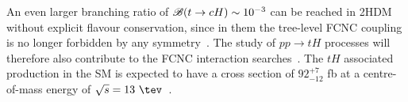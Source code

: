 An even larger branching ratio of  $\mathscr{B}(t\to cH) \sim 10^{-3}$ can be reached in 2HDM without explicit flavour conservation, since in them the tree-level FCNC coupling is no longer forbidden by any symmetry~\cite{Cheng:1987rs,Baum:2008qm,Chen:2013qta,Chiang:2015cba,Crivellin:2015hha,Botella:2015hoa, Gori:2017tvg,Chiang:2017fjr}. 
The study of $pp\rightarrow tH$ processes will therefore also contribute to the FCNC interaction searches~\cite{Greljo:2014dka}.
The $tH$ associated production in the SM is expected to have a cross section of $92^{+7}_{-12}$ fb at a centre-of-mass energy of $\sqrt{s}= 13~\tev$~\cite{deFlorian:2016spz}.

